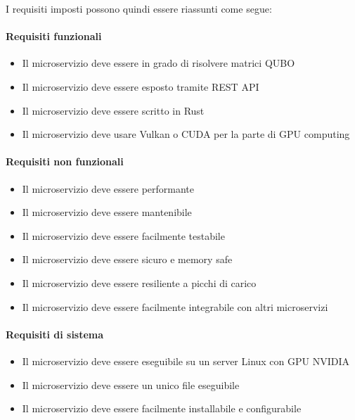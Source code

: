 I requisiti imposti possono quindi essere riassunti come segue:

\paragraph{Requisiti funzionali}
\begin{itemize}
    \item Il microservizio deve essere in grado di risolvere matrici QUBO
    \item Il microservizio deve essere esposto tramite REST API
    \item Il microservizio deve essere scritto in Rust
    \item Il microservizio deve usare Vulkan o CUDA per la parte di GPU computing
\end{itemize}

\paragraph{Requisiti non funzionali}
\begin{itemize}
    \item Il microservizio deve essere performante
    \item Il microservizio deve essere mantenibile
    \item Il microservizio deve essere facilmente testabile
    \item Il microservizio deve essere sicuro e memory safe
    \item Il microservizio deve essere resiliente a picchi di carico
    \item Il microservizio deve essere facilmente integrabile con altri microservizi
\end{itemize}

\paragraph{Requisiti di sistema}
\begin{itemize}
    \item Il microservizio deve essere eseguibile su un server Linux con GPU NVIDIA
    \item Il microservizio deve essere un unico file eseguibile
    \item Il microservizio deve essere facilmente installabile e configurabile
\end{itemize}




